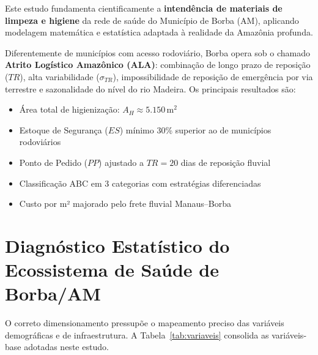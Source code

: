 \documentclass[12pt,a4paper]{article}
\begin{document}
Este estudo fundamenta cientificamente a \textbf{intendência de materiais de limpeza e higiene} da rede de saúde do Município de Borba (AM), aplicando modelagem matemática e estatística adaptada à realidade da Amazônia profunda.

Diferentemente de municípios com acesso rodoviário, Borba opera sob o chamado \textbf{Atrito Logístico Amazônico (ALA)}: combinação de longo prazo de reposição ($TR$), alta variabilidade ($\sigma_{TR}$), impossibilidade de reposição de emergência por via terrestre e sazonalidade do nível do rio Madeira. Os principais resultados são:

\begin{itemize}
  \item Área total de higienização: $A_H \approx 5.150\,\text{m}^2$
  \item Estoque de Segurança ($ES$) mínimo 30\% superior ao de municípios rodoviários
  \item Ponto de Pedido ($PP$) ajustado a $TR = 20$ dias de reposição fluvial
  \item Classificação ABC em 3 categorias com estratégias diferenciadas
  \item Custo por m² majorado pelo frete fluvial Manaus--Borba
\end{itemize}

\section{Diagnóstico Estatístico do Ecossistema de Saúde de Borba/AM}

O correto dimensionamento pressupõe o mapeamento preciso das variáveis demográficas e de infraestrutura. A Tabela~\ref{tab:variaveis} consolida as variáveis-base adotadas neste estudo.
\end{document}
